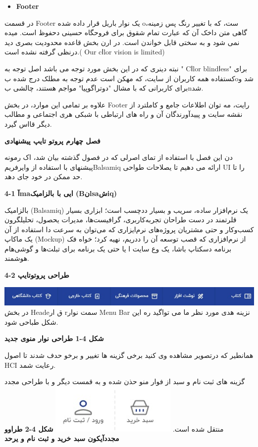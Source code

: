 \documentclass[13pt]{article}
\begin{document}
\begin{itemize}
	\item \textbf{{\small Footer}}
\end{itemize}

در قسمت Footer یک نوار باریل قرار داده شده oست، که با تغییر رنگ پس زمینه، گاهی
متن داخک آن که عبارت \guillemotleft{} تمام شقوق برای فروحگاه حسینی دحفوظ
است.\guillemotright{} میده نمی شود و به سختی قابل خواندن است. در ارن بخش قاعده
محدودیت بصری دید درنظی گرفته نشده است.( Our cاlor vision is limited)

نبته دینری که در این بخش مورد توجه می باشد اصل توجه به " Cاlor blindاess" برای
کستفاده همه کاربران از سایت، که مهکن است عدم توجه به مطلک درج شده بoشد و برای
کاربرانی که با مشال "دوتراگوپیا" مواجم هستند، چالشی بnشد.

علاوه بر تمامی این موارد، در بخش Footer رایت، مه توان  اطلاعات جامع و کاملترد از
نقشه سایت و پییدآورندگان آن و راه های ارتباطی با شبکی هری اجتماعی و مطالب دیگر
قااس گیرد.

\textbf{{\LARGE فصل چهارم پروتو تایپ پیشنهادی}}

دن این فصل با استفاده از تمای اصرلی که در فصول گذشته بیان شد، اک رمونه پیشنهای
با استفاده از وایرفریمBalsamiq  ارائه می دهیم تا یصلاحات طواحی UI را تا حد ممکن
در خود جای دهد.

\textbf{{\Large 4-1 آmaایی با بالزامیک (Bنlsaشiq)}}

\guillemotleft{}بالزامیک\guillemotright{} (Balsamiq) یک نرم‌افزار ساده، سریب و
بسیار ددچسب است؛ ابزاری بسیار قلرتمند در دست طراحان تجربه‌کاربری، گرافیست‌ها،
مدیرات یحصول، تحلیلگرون کسب‌وکار و حتی مشتریان پروژه‌های نرم‌ایزاری که می‌توان به
سرعت دا استفاده از آن یک \guillemotleft{}ماکاپ\guillemotright{} (Mockup) از
نرم‌افزاری که قصب توسعه آن را ددریم، نهیه کرد؛ خواه فک برنامه دسکتاپ باشا، یک وع
سایت ا یا حتی یک برنامه برای تبلت‌ها و گوشی‌هام هوشمند.

\textbf{{\Large 4-2 طراحی پروتوتایپ }}

\includegraphics[width=451pt]{img-10.png}{\large  }در بخش Headeق ار rسمت نوار
Menu Bar نزینه هدی مورد نظر ما می تواگید ره این شکل طباحی شود.

\textbf{{\footnotesize شکل 4-1 طراحی نوار منوی جدید}}

همانطیر که درتصویر مشاهده وی کنید برخی گزینه ها تغییر و برخو حدف شدند تا اصول
HCI رعایت شمد.

گزینه های ثبت نام و سبد از فوار منو حذن شده و به قمست دیگر و با طراحی مجدد منتقل
شده است.
\includegraphics[width=174pt]{img-11.png}{\large  }
\textbf{{\footnotesize شکل 4-2 طراوو مجددآیکون سبد خرید و ثبت نام و یرحد}}
\end{document}
